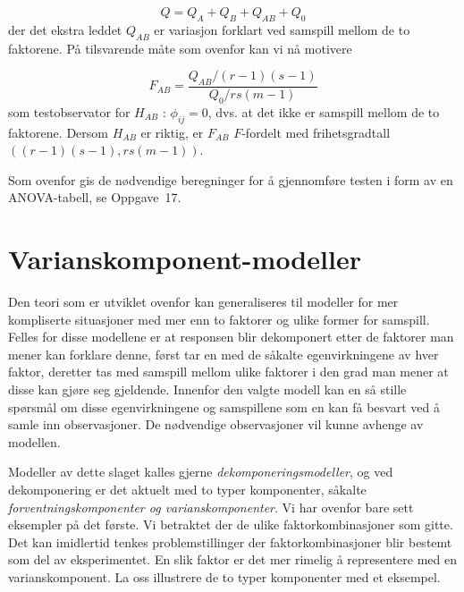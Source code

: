\[ Q=Q_A+Q_B+Q_{AB}+Q_{0} \]
der det ekstra leddet $Q_{AB}$ er variasjon forklart ved samspill mellom de 
to faktorene. På tilsvarende måte som ovenfor kan vi nå motivere

\[ F_{AB}=\frac{Q_{AB}/(r-1)(s-1)}{Q_0/rs(m-1)} \]
som testobservator for $H_{AB}$ : ${\phi}_{ij}=0$, dvs. at det ikke er
 samspill mellom de to faktorene. Dersom $H_{AB}$ er riktig, er $F_{AB}$
 $F$-fordelt med frihetsgradtall $((r-1)(s-1),rs(m-1))$.

Som ovenfor gis de nødvendige beregninger for å gjennomføre 
testen i form av en ANOVA-tabell, se Oppgave~17.


\section{Varianskomponent-modeller}
Den teori som er utviklet ovenfor kan generaliseres til modeller for
mer kompliserte situasjoner med mer enn to faktorer og ulike former
for samspill.  Felles for disse modellene er at responsen blir
dekomponert etter de faktorer man mener kan forklare denne, først
tar en med de såkalte egenvirkningene av hver faktor, deretter tas
med samspill mellom ulike faktorer i den grad man mener at disse kan
gjøre seg gjeldende.  Innenfor den valgte modell kan en så 
stille spørsmål om disse egenvirkningene og samspillene som en
kan få besvart ved å samle inn observasjoner.  De nødvendige
observasjoner vil kunne avhenge av modellen.

Modeller av dette slaget kalles gjerne {\em dekomponeringsmodeller}, og
ved dekomponering er det aktuelt med to typer komponenter, såkalte
{\em forventningskomponenter og varianskomponenter}.  Vi har ovenfor
bare sett eksempler på det første.  Vi betraktet der de ulike 
faktorkombinasjoner som gitte.  Det kan imidlertid tenkes problemstillinger
der faktorkombinasjoner blir bestemt som del av eksperimentet.  En slik
faktor er det mer rimelig å representere med en varianskomponent.
La oss illustrere de to typer komponenter med et eksempel. \\


